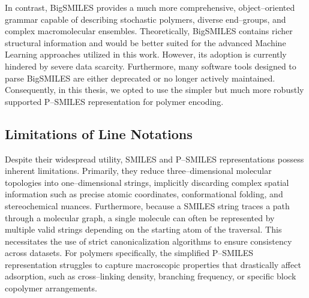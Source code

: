 In contrast, BigSMILES provides a much more comprehensive, object--oriented grammar capable of describing stochastic polymers, diverse end--groups, and complex macromolecular ensembles. Theoretically, BigSMILES contains richer structural information and would be better suited for the advanced Machine Learning approaches utilized in this work. However, its adoption is currently hindered by severe data scarcity. Furthermore, many software tools designed to parse BigSMILES are either deprecated or no longer actively maintained. Consequently, in this thesis, we opted to use the simpler but much more robustly supported P--SMILES representation for polymer encoding.

\subsection*{Limitations of Line Notations}
Despite their widespread utility, SMILES and P--SMILES representations possess inherent limitations. Primarily, they reduce three--dimensional molecular topologies into one--dimensional strings, implicitly discarding complex spatial information such as precise atomic coordinates, conformational folding, and stereochemical nuances. Furthermore, because a SMILES string traces a path through a molecular graph, a single molecule can often be represented by multiple valid strings depending on the starting atom of the traversal. This necessitates the use of strict canonicalization algorithms to ensure consistency across datasets. For polymers specifically, the simplified P--SMILES representation struggles to capture macroscopic properties that drastically affect adsorption, such as cross--linking density, branching frequency, or specific block copolymer arrangements.


